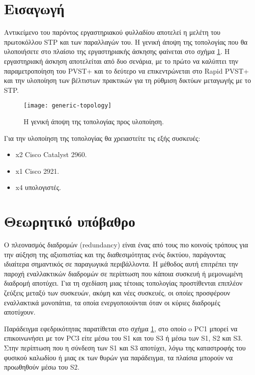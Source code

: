 \documentclass[eforms]{EdipyLabs} %
\begin{document}
\Initialize

\section*{Εισαγωγή}
Αντικείμενο του παρόντος εργαστηριακού φυλλαδίου αποτελεί η μελέτη του πρωτοκόλλου STP και των παραλλαγών του. Η γενική άποψη της τοπολογίας που θα υλοποιήσετε στο πλαίσιο της εργαστηριακής άσκησης φαίνεται στο σχήμα \ref{fig:generic}. Η εργαστηριακή άσκηση αποτελείται από δυο σενάρια, με το πρώτο να καλύπτει την παραμετροποίηση του PVST+ και το δεύτερο να επικεντρώνεται στο Rapid PVST+ και την υλοποίηση των βέλτιστων πρακτικών για τη ρύθμιση δικτύων μεταγωγής με το STP. 

\begin{figure}[ht]
	\centering
	\texttt{[image: generic-topology]}
	\caption{Η γενική άποψη της τοπολογίας προς υλοποίηση.}\label{fig:generic}
\end{figure}

Για την υλοποίηση της τοπολογίας θα χρειαστείτε τις εξής συσκευές:
\begin{itemize}
	\item x2 Cisco Catalyst 2960.
	\item x1 Cisco 2921.
	\item x4 υπολογιστές.
\end{itemize}

\section{Θεωρητικό υπόβαθρο}

Ο πλεονασμός διαδρομών (redundancy) είναι ένας από τους πιο κοινούς τρόπους για την αύξηση της αξιοπιστίας και της διαθεσιμότητας ενός δικτύου, παράγοντας ιδιαίτερα σημαντικός σε παραγωγικά περιβάλλοντα. Η μέθοδος αυτή επιτρέπει την παροχή εναλλακτικών διαδρομών σε περίπτωση που κάποια συσκευή ή μεμονωμένη διαδρομή αποτύχει. Για τη σχεδίαση μιας τέτοιας τοπολογίας προστίθενται επιπλέον ζεύξεις μεταξύ των συσκευών, ακόμη και νέες συσκευές, οι οποίες προσφέρουν εναλλακτικά μονοπάτια, τα οποία ενεργοποιούνται όταν οι κύριες διαδρομές αποτύχουν. 

Παράδειγμα εφεδρικότητας παρατίθεται στο σχήμα \ref{fig:generic}, στο οποίο o PC1 μπορεί να επικοινωνήσει με τον PC3 είτε μέσω του S1 και του S3 ή μέσω των S1, S2 και S3. Στην περίπτωση που η σύνδεση των S1 και S3 αποτύχει, λόγω της καταστροφής του φυσικού καλωδίου ή μιας εκ των θυρών για παράδειγμα, τα πλαίσια μπορούν να προωθηθούν μέσω του S2.
\end{document}
